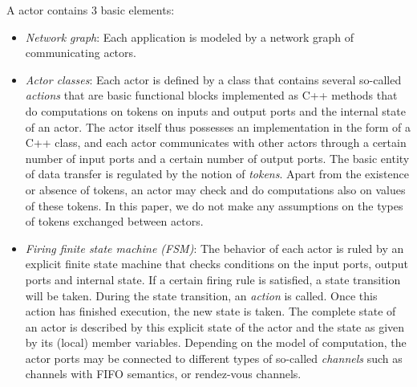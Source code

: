 A \SysteMoC{} actor contains 3 basic elements:

\begin{itemize}
\item {\em Network graph}: Each application is modeled 
by a network graph of communicating actors.
\item {\em Actor classes}: Each actor is defined 
by a class that contains several 
so-called {\em actions} that are basic functional blocks implemented as 
C++ methods that do computations on tokens on inputs and output ports 
and the internal state of an actor. The actor itself thus possesses an 
implementation in the form of a C++ class, and
each actor communicates with other actors through a certain number 
of input ports and a certain number of output ports. 
The basic entity of data transfer is regulated by the notion of 
{\em tokens}. Apart from the existence or absence of tokens, an actor 
may check and do computations also on values of these tokens. 
In this paper, we do not make any assumptions on the types 
of tokens exchanged between actors. 
\item {\em Firing finite state machine (FSM)}: The behavior of each actor is ruled 
by an explicit finite state machine that checks conditions on the input ports, 
output ports and internal state. If a certain firing rule is satisfied, 
a state transition will be taken. During the state transition, an {\em action}
is called. Once this action has finished execution, the new state is 
taken. The complete state of an actor is described by this explicit 
state of the actor and the state as given by its (local) member variables.
Depending on the model of computation, 
the actor ports may be connected to different types of so-called {\em channels} such 
as channels with FIFO semantics, or rendez-vous channels.
\end{itemize}

